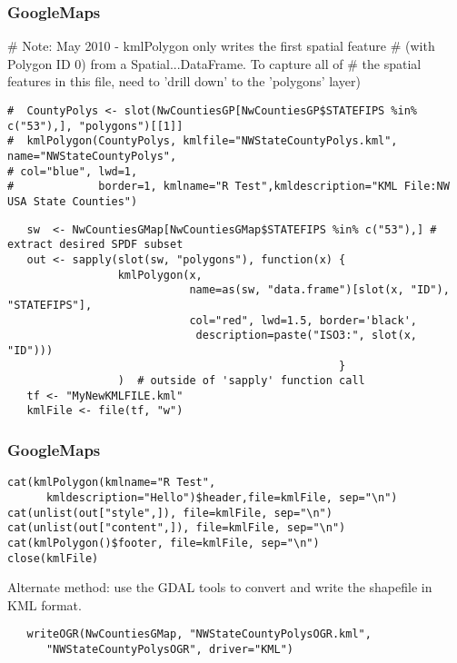 \documentclass{beamer}
\begin{document}
\begin{frame}[fragile]
\frametitle{GoogleMaps}

# Note: May 2010 - kmlPolygon only writes the first spatial feature
# (with Polygon ID 0) from a Spatial...DataFrame. To capture all of 
# the spatial features in this file, need to 'drill down' to the 'polygons' layer) 
\begin{verbatim}
#  CountyPolys <- slot(NwCountiesGP[NwCountiesGP$STATEFIPS %in% c("53"),], "polygons")[[1]]  
#  kmlPolygon(CountyPolys, kmlfile="NWStateCountyPolys.kml", name="NWStateCountyPolys",
# col="blue", lwd=1,
#             border=1, kmlname="R Test",kmldescription="KML File:NW USA State Counties")
\end{verbatim}
\end{frame}
\begin{frame}[fragile]
\begin{framed}
\begin{verbatim}
   sw  <- NwCountiesGMap[NwCountiesGMap$STATEFIPS %in% c("53"),] # extract desired SPDF subset 
   out <- sapply(slot(sw, "polygons"), function(x) {
                 kmlPolygon(x,
                            name=as(sw, "data.frame")[slot(x, "ID"), "STATEFIPS"],     
                            col="red", lwd=1.5, border='black', 
                             description=paste("ISO3:", slot(x, "ID")))
                                                   }
                 )  # outside of 'sapply' function call
   tf <- "MyNewKMLFILE.kml" 
   kmlFile <- file(tf, "w")
\end{verbatim}   
\end{framed}
\end{frame}
\begin{frame}[fragile]
\frametitle{GoogleMaps}
\begin{framed}
\begin{verbatim}
cat(kmlPolygon(kmlname="R Test", 
      kmldescription="Hello")$header,file=kmlFile, sep="\n")
cat(unlist(out["style",]), file=kmlFile, sep="\n")
cat(unlist(out["content",]), file=kmlFile, sep="\n")
cat(kmlPolygon()$footer, file=kmlFile, sep="\n")
close(kmlFile)
\end{verbatim}
\end{framed}
Alternate method: use the GDAL tools  to convert and write the shapefile in KML format.  
\begin{framed}
\begin{verbatim}
   writeOGR(NwCountiesGMap, "NWStateCountyPolysOGR.kml",
      "NWStateCountyPolysOGR", driver="KML")  
\end{verbatim}
\end{framed}
\end{frame}
\end{document}
